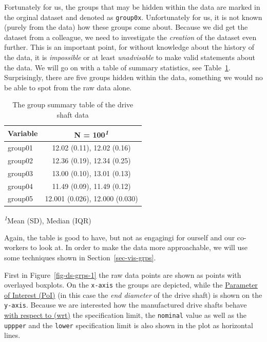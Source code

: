 \documentclass[
  a4paper,
]{scrbook}
\begin{document}
Fortunately for us, the groups that may be hidden within the data are
marked in the orginal dataset and denoted as \texttt{group0x}.
Unfortunately for us, it is not known (purely from the data) how these
groups come about. Because we did get the dataset from a colleague, we
need to investigate the \emph{creation} of the dataset even further.
This is an important point, for without knowledge about the history of
the data, it is \emph{impossible} or at least \emph{unadvisable} to make
valid statements about the data. We will go on with a table of summary
statistics, see Table~\ref{tbl-ds-sum-grps}. Surprisingly, there are
five groups hidden within the data, something we would no be able to
spot from the raw data alone.

\begingroup
\fontsize{12.0pt}{14.4pt}\selectfont
\setlength{\LTpost}{0mm}

\begin{longtable}{lc}

\caption{\label{tbl-ds-sum-grps}The group summary table of the drive
shaft data}

\tabularnewline

\toprule
\textbf{Variable} & \textbf{N = 100}\textsuperscript{\textit{1}} \\ 
\midrule\addlinespace[2.5pt]
group01 & 12.02 (0.11), 12.02 (0.16) \\ 
group02 & 12.36 (0.19), 12.34 (0.25) \\ 
group03 & 13.00 (0.10), 13.01 (0.13) \\ 
group04 & 11.49 (0.09), 11.49 (0.12) \\ 
group05 & 12.001 (0.026), 12.000 (0.030) \\ 
\bottomrule

\end{longtable}

\begin{minipage}{\linewidth}
\textsuperscript{\textit{1}}Mean (SD), Median (IQR)\\
\end{minipage}
\endgroup

Again, the table is good to have, but not as engagingi for ourself and
our co-workers to look at. In order to make the data more approachable,
we will use some techniques shown in Section~\ref{sec-vis-grps}.

First in Figure~\ref{fig-ds-grps-1} the raw data points are shown as
points with overlayed boxplots. On the \texttt{x-axis} the groups are
depicted, while the \hyperref[acronyms_PoI]{Parameter of Interest (PoI)}
(in this case the \emph{end diameter} of the drive shaft) is shown on
the \texttt{y-axis}. Because we are interested how the manufactured
drive shafts behave \hyperref[acronyms_wrt]{with respect to (wrt)} the
specification limit, the \texttt{nominal} value as well as the
\texttt{uppper} and the \texttt{lower} specification limit is also shown
in the plot as horizontal lines.
\end{document}
